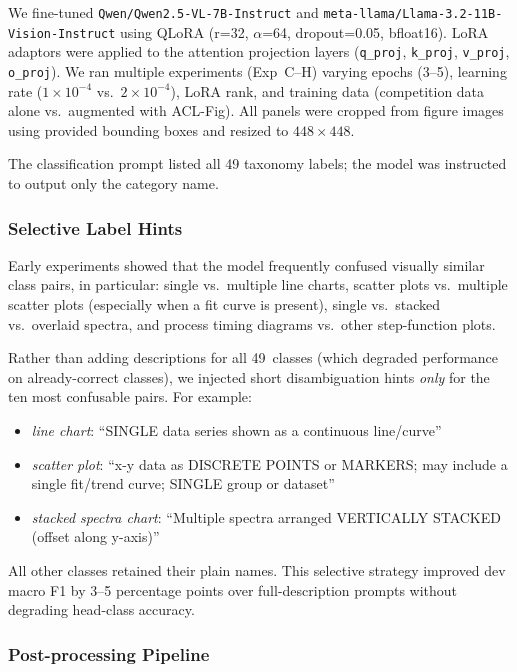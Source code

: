 \documentclass[11pt]{tibop-article}
\begin{document}
We fine-tuned \texttt{Qwen/Qwen2.5-VL-7B-Instruct} \cite{qwen25vl} and
\texttt{meta-llama/Llama-3.2-11B-Vision-Instruct} \cite{llama32} using QLoRA
\cite{qlora} (r=32, $\alpha$=64, dropout=0.05, bfloat16).
LoRA adaptors were applied to the attention projection layers
(\texttt{q\_proj}, \texttt{k\_proj}, \texttt{v\_proj}, \texttt{o\_proj}).
We ran multiple experiments (Exp~C--H) varying epochs (3--5), learning rate
($1\times10^{-4}$ vs.\ $2\times10^{-4}$), LoRA rank, and training data
(competition data alone vs.\ augmented with ACL-Fig).
All panels were cropped from figure images using provided bounding boxes and
resized to $448\times448$.

The classification prompt listed all 49 taxonomy labels; the model was
instructed to output only the category name.

\subsubsection{Selective Label Hints}
\label{sec:hints}

Early experiments showed that the model frequently confused visually similar
class pairs, in particular:
single vs.\ multiple line charts,
scatter plots vs.\ multiple scatter plots (especially when a fit curve is present),
single vs.\ stacked vs.\ overlaid spectra, and
process timing diagrams vs.\ other step-function plots.

Rather than adding descriptions for all 49~classes (which degraded performance
on already-correct classes), we injected short disambiguation hints \emph{only}
for the ten most confusable pairs.
For example:
\begin{itemize}
  \item \textit{line chart}: ``SINGLE data series shown as a continuous line/curve''
  \item \textit{scatter plot}: ``x-y data as DISCRETE POINTS or MARKERS; may include a
        single fit/trend curve; SINGLE group or dataset''
  \item \textit{stacked spectra chart}: ``Multiple spectra arranged VERTICALLY STACKED
        (offset along y-axis)''
\end{itemize}
All other classes retained their plain names.
This selective strategy improved dev macro F1 by 3--5 percentage points over
full-description prompts without degrading head-class accuracy.

\subsubsection{Post-processing Pipeline}
\label{sec:postprocess}
\end{document}
